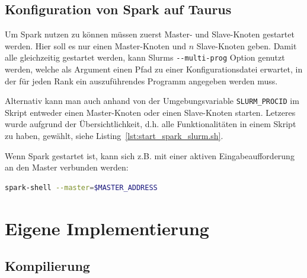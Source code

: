 \documentclass[german,bibnum,beleg,zihtitle,german,hyperref,utf8]{zihpub}
\begin{document}
\section{Konfiguration von Spark auf Taurus}

Um Spark nutzen zu können müssen zuerst Master- und Slave-Knoten gestartet werden. Hier soll es nur einen Master-Knoten und $n$ Slave-Knoten geben. Damit alle gleichzeitig gestartet werden, kann Slurms \lstinline!--multi-prog! Option genutzt werden, welche als Argument einen Pfad zu einer Konfigurationsdatei erwartet, in der für jeden Rank ein auszuführendes Programm angegeben werden muss.

Alternativ kann man auch anhand von der Umgebungsvariable \lstinline!SLURM_PROCID! im Skript entweder einen Master-Knoten oder einen Slave-Knoten starten. Letzeres wurde aufgrund der Übersichtlichkeit, d.h. alle Funktionalitäten in einem Skript zu haben, gewählt, siehe Listing~\ref{lst:start_spark_slurm.sh}.

Wenn Spark gestartet ist, kann sich z.B. mit einer aktiven Eingabeaufforderung an den Master verbunden werden:
\begin{lstlisting}[language=bash]
spark-shell --master=$MASTER_ADDRESS
\end{lstlisting}\vspace{-1.5\baselineskip}


\chapter{Eigene Implementierung}
\label{sct:implementation}

\section{Kompilierung}
\end{document}
